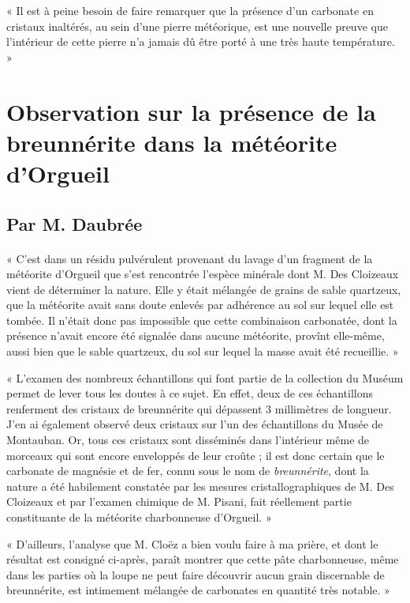 \documentclass[a4paper, 11pt, oneside, polutonikogreek, french]{article}
\begin{document}
« Il est à peine besoin de faire remarquer que la présence d'un carbonate en cristaux inaltérés, au sein d'une pierre météorique, est une nouvelle preuve que l'intérieur de cette pierre n'a jamais dû être porté à une très haute température. »
\clearpage
\section{Observation sur la présence de la breunnérite dans la météorite d'Orgueil}
\subsection*{Par M. Daubrée}
\paragraph{}
« C'est dans un résidu pulvérulent provenant du lavage d'un fragment de la météorite d'Orgueil que s'est rencontrée l'espèce minérale dont M. Des Cloizeaux vient de déterminer la nature. Elle y était mélangée de grains de sable quartzeux, que la météorite avait sans doute enlevés par adhérence au sol sur lequel elle est tombée. Il n'était donc pas impossible que cette combinaison carbonatée, dont la présence n'avait encore été signalée dans aucune météorite, provînt elle-même, aussi bien que le sable quartzeux, du sol sur lequel la masse avait été recueillie. »

« L'examen des nombreux échantillons qui font partie de la collection du Muséum permet de lever tous les doutes à ce sujet. En effet, deux de ces échantillons renferment des cristaux de breunnérite qui dépassent 3 millimètres de longueur. J'en ai également observé deux cristaux sur l'un des échantillons du Musée de Montauban. Or, tous ces cristaux sont disséminés dans l'intérieur même de morceaux qui sont encore enveloppés de leur croûte ; il est donc certain que le carbonate de magnésie et de fer, connu sous le nom de \emph{breunnérite}, dont la nature a été habilement constatée par les mesures cristallographiques de M. Des Cloizeaux et par l'examen chimique de M. Pisani, fait réellement partie constituante de la météorite charbonneuse d'Orgueil. »

« D'ailleurs, l'analyse que M. Cloëz a bien voulu faire à ma prière, et dont le résultat est consigné ci-après, paraît montrer que cette pâte charbonneuse, même dans les parties où la loupe ne peut faire découvrir aucun grain discernable de breunnérite, est intimement mélangée de carbonates en quantité très notable. »
\clearpage
\end{document}
